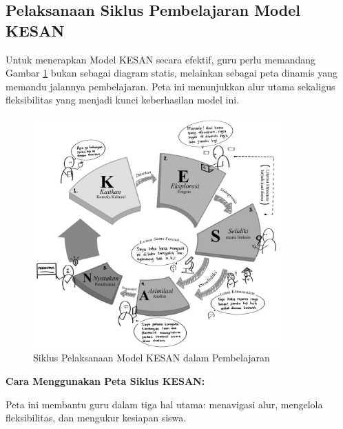 \documentclass[12pt,a4paper,oneside]{book}
\begin{document}
\clearpage

\subsection{Pelaksanaan Siklus Pembelajaran Model KESAN}

Untuk menerapkan Model KESAN secara efektif, guru perlu memandang Gambar \ref{fig:kesanA} bukan sebagai diagram statis, melainkan sebagai peta dinamis yang memandu jalannya pembelajaran. Peta ini menunjukkan alur utama sekaligus fleksibilitas yang menjadi kunci keberhasilan model ini.

\begin{figure}[H]
\centering
\includegraphics[width=0.85\textwidth]{kesanA.jpg}
\caption{Siklus Pelaksanaan Model KESAN dalam Pembelajaran}
\label{fig:kesanA}
\end{figure}

\textbf{Cara Menggunakan Peta Siklus KESAN:}

Peta ini membantu guru dalam tiga hal utama: menavigasi alur, mengelola fleksibilitas, dan mengukur kesiapan siswa.
\end{document}
